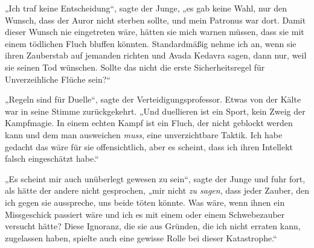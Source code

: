 „Ich traf keine Entscheidung“, sagte der Junge, „es gab keine Wahl, nur den Wunsch, dass der Auror nicht sterben sollte, und mein Patronus war dort. Damit dieser Wunsch nie eingetreten wäre, hätten sie mich warnen müssen, dass sie mit einem tödlichen Fluch bluffen könnten. Standardmäßig nehme ich an, wenn sie ihren Zauberstab auf jemanden richten und Avada Kedavra sagen, dann nur, weil sie seinen Tod wünschen. Sollte das nicht die erste Sicherheitsregel für Unverzeihliche Flüche sein?“

„Regeln sind für Duelle“, sagte der Verteidigungsprofessor. Etwas von der Kälte war in seine Stimme zurückgekehrt.
„Und duellieren ist ein Sport, kein Zweig der Kampfmagie. In einem echten Kampf ist ein Fluch, der nicht geblockt werden kann und dem man ausweichen \emph{muss}, eine unverzichtbare Taktik. Ich habe gedacht das wäre für sie offensichtlich, aber es scheint, dass ich ihren Intellekt falsch eingeschätzt habe.“

„Es scheint mir auch unüberlegt gewesen zu sein“, sagte der Junge und fuhr fort, als hätte der andere nicht gesprochen, „mir nicht \emph{zu sagen}, dass jeder Zauber, den ich gegen sie ausspreche, uns beide töten könnte. Was wäre, wenn ihnen ein Missgeschick passiert wäre und ich es mit einem  oder einem Schwebezauber versucht hätte? Diese Ignoranz, die sie aus Gründen, die ich nicht erraten kann, zugelassen haben, spielte auch eine gewisse Rolle bei dieser Katastrophe.“

